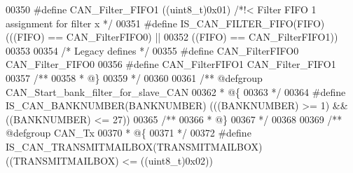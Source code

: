 \begin{DoxyCode}
00350 \textcolor{preprocessor}{#}\textcolor{preprocessor}{define} \textcolor{preprocessor}{CAN\_Filter\_FIFO1}             \textcolor{preprocessor}{(}\textcolor{preprocessor}{(}\textcolor{preprocessor}{uint8\_t}\textcolor{preprocessor}{)}0x01\textcolor{preprocessor}{)}  \textcolor{comment}{/*!< Filter FIFO 1 assignment for filter x */}
00351 \textcolor{preprocessor}{#}\textcolor{preprocessor}{define} \textcolor{preprocessor}{IS\_CAN\_FILTER\_FIFO}\textcolor{preprocessor}{(}\textcolor{preprocessor}{FIFO}\textcolor{preprocessor}{)} \textcolor{preprocessor}{(}\textcolor{preprocessor}{(}\textcolor{preprocessor}{(}\textcolor{preprocessor}{FIFO}\textcolor{preprocessor}{)} \textcolor{preprocessor}{==} CAN_FilterFIFO0\textcolor{preprocessor}{)} \textcolor{preprocessor}{||}
00352                                   \textcolor{preprocessor}{(}\textcolor{preprocessor}{(}\textcolor{preprocessor}{FIFO}\textcolor{preprocessor}{)} \textcolor{preprocessor}{==} CAN_FilterFIFO1\textcolor{preprocessor}{)}\textcolor{preprocessor}{)}
00353 
00354 \textcolor{comment}{/* Legacy defines */}
00355 \textcolor{preprocessor}{#}\textcolor{preprocessor}{define} \textcolor{preprocessor}{CAN\_FilterFIFO0}  CAN_Filter_FIFO0
00356 \textcolor{preprocessor}{#}\textcolor{preprocessor}{define} \textcolor{preprocessor}{CAN\_FilterFIFO1}  CAN_Filter_FIFO1
00357 \textcolor{comment}{/**}
00358 \textcolor{comment}{  * @\}}
00359 \textcolor{comment}{  */}
00360 
00361 \textcolor{comment}{/** @defgroup CAN\_Start\_bank\_filter\_for\_slave\_CAN }
00362 \textcolor{comment}{  * @\{}
00363 \textcolor{comment}{  */}
00364 \textcolor{preprocessor}{#}\textcolor{preprocessor}{define} \textcolor{preprocessor}{IS\_CAN\_BANKNUMBER}\textcolor{preprocessor}{(}\textcolor{preprocessor}{BANKNUMBER}\textcolor{preprocessor}{)} \textcolor{preprocessor}{(}\textcolor{preprocessor}{(}\textcolor{preprocessor}{(}\textcolor{preprocessor}{BANKNUMBER}\textcolor{preprocessor}{)} \textcolor{preprocessor}{>=} 1\textcolor{preprocessor}{)} \textcolor{preprocessor}{&&} \textcolor{preprocessor}{(}\textcolor{preprocessor}{(}\textcolor{preprocessor}{BANKNUMBER}\textcolor{preprocessor}{)} \textcolor{preprocessor}{<=} 27\textcolor{preprocessor}{)}\textcolor{preprocessor}{)}
00365 \textcolor{comment}{/**}
00366 \textcolor{comment}{  * @\}}
00367 \textcolor{comment}{  */}
00368 
00369 \textcolor{comment}{/** @defgroup CAN\_Tx }
00370 \textcolor{comment}{  * @\{}
00371 \textcolor{comment}{  */}
00372 \textcolor{preprocessor}{#}\textcolor{preprocessor}{define} \textcolor{preprocessor}{IS\_CAN\_TRANSMITMAILBOX}\textcolor{preprocessor}{(}\textcolor{preprocessor}{TRANSMITMAILBOX}\textcolor{preprocessor}{)} \textcolor{preprocessor}{(}\textcolor{preprocessor}{(}\textcolor{preprocessor}{TRANSMITMAILBOX}\textcolor{preprocessor}{)} \textcolor{preprocessor}{<=} \textcolor{preprocessor}{(}\textcolor{preprocessor}{(}\textcolor{preprocessor}{uint8\_t}\textcolor{preprocessor}{)}0x02\textcolor{preprocessor}{)}\textcolor{preprocessor}{)}

\end{DoxyCode}
